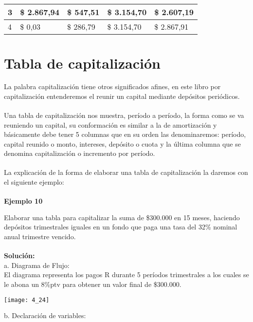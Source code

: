 {\begin{center}
\begin{tabular}{ |p{1.5cm}|p{3cm}|p{2cm}|p{2cm}|p{3cm}| }
3 & \$ 2.867,94    & \$ 547,51    & \$ 3.154,70  & \$ 2.607,19 \\ \hline 

4 & \$ 0,03        & \$ 286,79    & \$ 3.154,70  & \$ 2.867,91 \\ \hline 

\end{tabular}
\end{center}

\section{Tabla de capitalización}
La palabra capitalización tiene otros significados afines, en este libro por capitalización entenderemos el reunir un capital mediante depósitos periódicos.
\\\\
Una tabla de capitalización nos muestra, período a período, la forma como se va reuniendo un capital, su conformación es similar a la de amortización y básicamente debe tener 5 columnas que en su orden las denominaremos: período, capital reunido o monto, intereses, depósito o cuota y la última columna que se denomina capitalización o incremento por período.
\\\\
La explicación de la forma de elaborar una tabla de capitalización la daremos con el siguiente ejemplo:
\\\\
\textbf{Ejemplo 10}

\vspace{5mm}

Elaborar una tabla para capitalizar la suma de \$300.000 en 15 meses, haciendo depósitos trimestrales iguales en un fondo que paga una tasa del 32\% nominal anual trimestre vencido.
\\\\
\textbf{Solución:}
\\
a. Diagrama de Flujo:\\

El diagrama representa los pagos R durante 5 períodos trimestrales a los cuales se le abona un 8\%ptv para obtener un valor final de \$300.000.

\begin{center}
	\texttt{[image: 4\_24]}\\
\end{center}

b. Declaración de variables:\\

}
